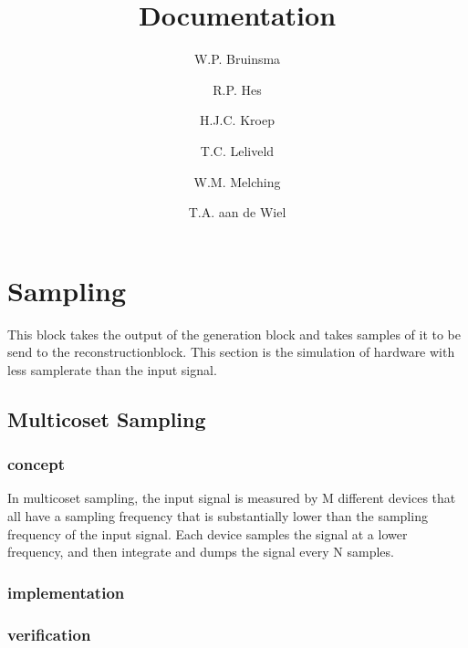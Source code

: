 \documentclass[report, oneside, a4paper, openany]{memoir}
\title{Documentation}
\author{W.P. Bruinsma \and R.P. Hes \and H.J.C. Kroep \and T.C. Leliveld \and W.M. Melching \and T.A. aan de Wiel}
\begin{document}
\chapter{Sampling}
This block takes the output of the generation block and takes samples of it to be send to the reconstructionblock. 
This section is the simulation of hardware with less samplerate than the input signal.


\section{Multicoset Sampling}
\subsection{concept}
In multicoset sampling, the input signal is measured by M different devices that all have a sampling frequency that is substantially lower than the sampling frequency of the input signal. Each device samples the signal at a lower frequency, and then integrate and dumps the signal every N samples.

\subsection{implementation}

\subsection{verification}
\end{document}
